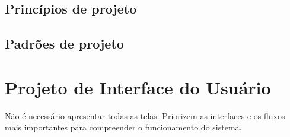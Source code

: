 \documentclass[a4paper,12pt,oneside,openany]{book}
\newif\iforientacoes
\newcommand{\orientacao}[1]{%
    \iforientacoes
        \begin{quote}
        \small\itshape\textbf{Orientação:} #1
        \end{quote}
    \fi
}
\begin{document}
\section{Princípios de projeto}

\orientacao{Expliquem como os princípios de projeto discutidos na disciplina
	foram aplicados nos principais componentes ou classes do sistema. Por exemplo,
	podem ser discutidos aspectos relacionados à separação de responsabilidades,
	coesão, acoplamento, dependência de abstrações e princípios SOLID. Não apenas
	enumerem os princípios: indiquem onde foram aplicados e qual problema de
	projeto ajudaram a resolver. Para evidenciar sua aplicação, utilizem, quando
	adequado, diagramas de classes ou trechos de código-fonte.}


\section{Padrões de projeto}

\orientacao{Para cada padrão de projeto efetivamente utilizado, indiquem o
problema que motivou sua aplicação, as classes ou componentes participantes,
como o padrão foi aplicado e qual benefício se espera obter. Não utilizem
padrões apenas para preencher esta seção.}

\chapter{Projeto de Interface do Usuário}

\orientacao{Apresentem as interfaces e os principais fluxos de interação do
usuário com o sistema. O principal artefato pode ser constituído por
protótipos de baixa ou alta fidelidade. Diagramas de atividade, fluxos de
navegação ou outros artefatos podem complementar a explicação.}

Não é necessário apresentar todas as telas. Priorizem as interfaces e os
fluxos mais importantes para compreender o funcionamento do sistema.

\orientacao{Para cada fluxo principal, expliquem brevemente a tarefa do
usuário e as decisões de interface relevantes. Se a equipe utilizar uma
ferramenta externa, como Figma, apresentem exemplos representativos neste
documento e forneçam o link para o material completo.}
\end{document}
